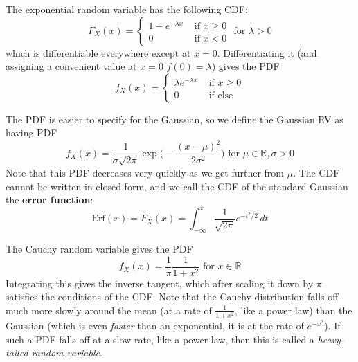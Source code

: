 \documentclass{article}
\begin{document}
      \begin{example}
        The exponential random variable has the following CDF: 
        \begin{equation}
          F_X (x) = \begin{cases} 1 - e^{-\lambda x} & \text{ if } x \geq 0 \\ 0 & \text{ if } x < 0 \end{cases} \text{ for } \lambda > 0
        \end{equation}
        which is differentiable everywhere except at $x = 0$. Differentiating it (and assigning a convenient value at $x = 0$ $f(0) = \lambda$) gives the PDF 
        \begin{equation}
          f_X (x) = \begin{cases} \lambda e^{-\lambda x} & \text{ if } x \geq 0 \\ 0 & \text{ if else} \end{cases}
        \end{equation}
      \end{example}

      \begin{example}
        The PDF is easier to specify for the Gaussian, so we define the Gaussian RV as having PDF 
        \begin{equation}
          f_X (x) = \frac{1}{\sigma \sqrt{2 \pi}} \exp \bigg( -\frac{(x - \mu)^2}{2 \sigma^2} \bigg) \text{ for } \mu \in \mathbb{R}, \sigma > 0
        \end{equation}
        Note that this PDF decreases very quickly as we get further from $\mu$. The CDF cannot be written in closed form, and we call the CDF of the standard Gaussian the \textbf{error function}: 
        \begin{equation}
          \mathrm{Erf}(x) = F_X (x) = \int_{-\infty}^x \frac{1}{\sqrt{2 \pi}} e^{- t^2 / 2} \, dt
        \end{equation}
      \end{example}

      \begin{example}
        The Cauchy random variable gives the PDF 
        \begin{equation}
          f_X (x) = \frac{1}{\pi} \frac{1}{1 + x^2} \text{ for } x \in \mathbb{R}
        \end{equation}
        Integrating this gives the inverse tangent, which after scaling it down by $\pi$ satisfies the conditions of the CDF. Note that the Cauchy distribution falls off much more slowly around the mean (at a rate of $\frac{1}{1 + x^2}$, like a power law) than the Gaussian (which is even \textit{faster} than an exponential, it is at the rate of $e^{-x^2}$). If such a PDF falls off at a slow rate, like a power law, then this is called a \textit{heavy-tailed random variable}. 
      \end{example}
\end{document}
